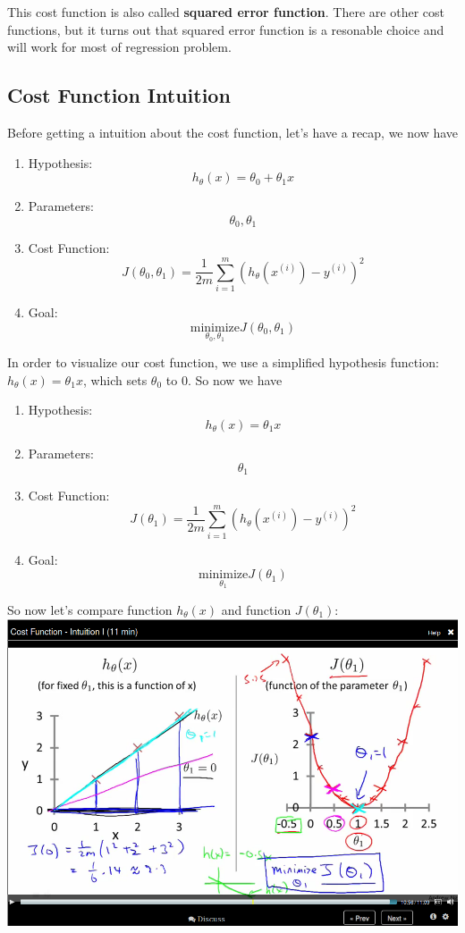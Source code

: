 \documentclass[11pt]{article}
\begin{document}
This cost function is also called \textbf{squared error function}. There are other cost functions, but it turns out that squared error function is a resonable choice and will work for most of regression problem.
\subsection*{Cost Function Intuition}
\label{sec-3-3}
Before getting a intuition about the cost function, let's have a recap, we now have
\begin{enumerate}
\item Hypothesis: \[h_\theta (x) = \theta_0 + \theta_1 x\]
\item Parameters: \[\theta_0,\theta_1\]
\item Cost Function: \[J(\theta_0,\theta_1) = \frac{1}{2m}\sum_{i=1}^{m}\left( h_\theta(x^{(i)}) - y^{(i)} \right)^2 \]
\item Goal: \[\underset{\theta_0,\theta_1}{\text{minimize}} J(\theta_0,\theta_1)\]
\end{enumerate}

In order to visualize our cost function, we use a simplified hypothesis function: \(h_\theta (x) = \theta_1 x\), which sets \(\theta_0\) to \(0\). So now we have
\begin{enumerate}
\item Hypothesis: \[h_\theta (x) =  \theta_1 x\]
\item Parameters: \[\theta_1\]
\item Cost Function: \[J(\theta_1) = \frac{1}{2m}\sum_{i=1}^{m}\left( h_\theta(x^{(i)}) - y^{(i)} \right)^2 \]
\item Goal: \[\underset{\theta_1}{\text{minimize}} J(\theta_1)\]
\end{enumerate}

So now let's compare function \(h_\theta (x)\) and function \(J(\theta_1)\):
\includegraphics[width=.9\linewidth]{./images/screenshot-05.png}
\end{document}
